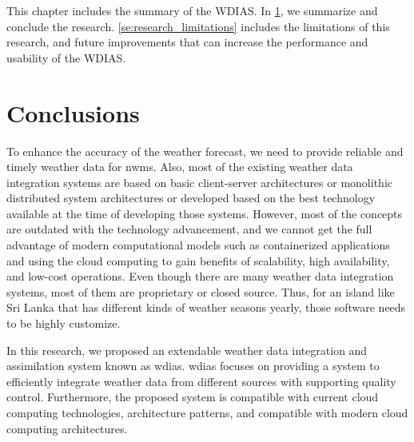 This chapter includes the summary of the WDIAS. In \cref{se:summary_conclusion}, we summarize and conclude the research. \cref{se:research_limitations} includes the limitations of this research, and future improvements that can increase the performance and usability of the WDIAS.

\section{Conclusions}
\label{se:summary_conclusion}

To enhance the accuracy of the weather forecast, we need to provide reliable and timely weather data for \acrshort{nwm}s. Also, most of the existing weather data integration systems are based on basic client-server architectures or monolithic distributed system architectures or developed based on the best technology available at the time of developing those systems. However, most of the concepts are outdated with the technology advancement, and we cannot get the full advantage of modern computational models such as containerized applications and using the cloud computing to gain benefits of scalability, high availability, and low-cost operations. Even though there are many weather data integration systems, most of them are proprietary or closed source. Thus, for an island like Sri Lanka that has different kinds of weather seasons yearly, those software needs to be highly customize.

In this research, we proposed an extendable weather data integration and assimilation system known as \acrfull{wdias}. \acrshort{wdias} focuses on providing a system to efficiently integrate weather data from different sources with supporting quality control. Furthermore, the proposed system is compatible with current cloud computing technologies, architecture patterns, and compatible with modern cloud computing architectures.


